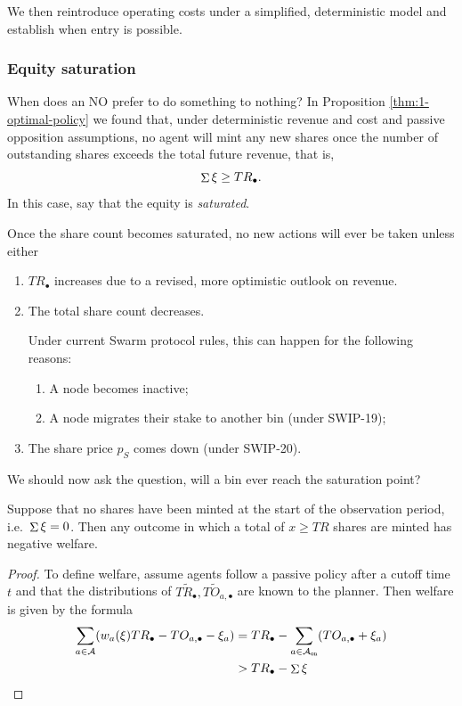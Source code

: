 We then reintroduce operating costs under a simplified, deterministic model and establish when entry is possible.

\subsubsection{Equity saturation}
\label{section:saturation}

When does an NO prefer to do something to nothing?
%
In Proposition \ref{thm:1-optimal-policy} we found that, under deterministic revenue and cost and passive opposition assumptions, no agent will mint any new shares once the number of outstanding shares exceeds the total future revenue, that is,
\[
  \mathop{\Sigma}\xi \geq TR_\bullet.
\]
%
In this case, say that the equity is \emph{saturated}.

Once the share count becomes saturated, no new actions will ever be taken unless either
\begin{enumerate}
  \item $TR_\bullet$ increases due to a revised, more optimistic outlook on revenue.
  \item The total share count decreases. 
  
    Under current Swarm protocol rules, this can happen for the following reasons:
  \begin{enumerate}
    \item A node becomes inactive;
    \item A node migrates their stake to another bin (under SWIP-19);
  \end{enumerate}
  \item The share price $p_S$ comes down (under SWIP-20).
\end{enumerate}

We should now ask the question, will a bin ever reach the saturation point?

\begin{proposition}

  Suppose that no shares have been minted at the start of the observation period, i.e.~$\mathop{\Sigma}\xi=0$.
  Then any outcome in which a total of $x\geq TR$ shares are minted has negative welfare.

\end{proposition}
%
\begin{proof}

  To define welfare, assume agents follow a passive policy after a cutoff time $t$ and that the distributions of $T\tilde{R}_\bullet,T\tilde{O}_{a,\bullet}$ are known to the planner.
  Then welfare is given by the formula
  \begin{align*}
    \sum_{a\in\mathcal{A}}(w_a(\xi)TR_\bullet-TO_{a,\bullet} - \xi_a) &= TR_\bullet - \sum_{a\in\mathcal{A}_{\mathtt{on}}}(TO_{a,\bullet} + \xi_a) \\
    &> TR_\bullet - \mathop{\Sigma} \xi \qedhere
  \end{align*}

\end{proof}

